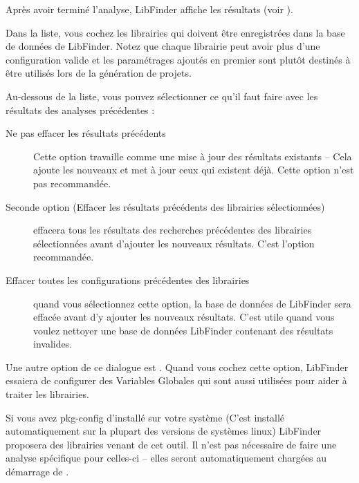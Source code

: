 
Après avoir terminé l'analyse, LibFinder affiche les résultats (voir ).


Dans la liste, vous cochez les librairies qui doivent être enregistrées dans la base de données de LibFinder. Notez que chaque librairie peut avoir plus d'une configuration valide et les paramétrages ajoutés en premier sont plutôt destinés à être utilisés lors de la génération de projets.

Au-dessous de la liste, vous pouvez sélectionner ce qu'il faut faire avec les résultats des analyses précédentes :

\begin{description}
\item[Ne pas effacer les résultats précédents] Cette option travaille comme une mise à jour des résultats existants -- Cela ajoute les nouveaux et met à jour ceux qui existent déjà. Cette option n'est pas recommandée.
\item[Seconde option (Effacer les résultats précédents des librairies sélectionnées)] effacera tous les résultats des recherches précédentes des librairies sélectionnées avant d'ajouter les nouveaux résultats. C'est l'option recommandée.
\item[Effacer toutes les configurations précédentes des librairies] quand vous sélectionnez cette option, la base de données de LibFinder sera effacée avant d'y ajouter les nouveaux résultats. C'est utile quand vous voulez nettoyer une base de données LibFinder contenant des résultats invalides.
\end{description}

Une autre option de ce dialogue est . Quand vous cochez cette option, LibFinder essaiera de configurer des Variables Globales qui sont aussi utilisées pour aider à  traiter les librairies.

Si vous avez pkg-config d’installé sur votre système (C'est installé automatiquement sur la plupart des versions de systèmes linux) LibFinder proposera des librairies venant de cet outil. Il n'est pas nécessaire de faire une analyse spécifique pour celles-ci -- elles seront automatiquement chargées au démarrage de \codeblocks.

